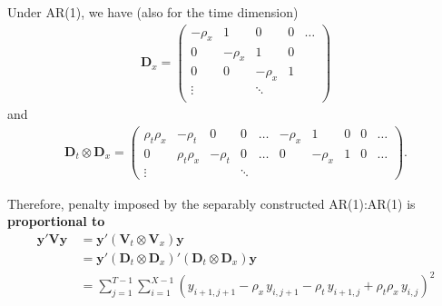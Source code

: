 \documentclass[12pt,a4paper]{article}
\begin{document}
Under AR(1), we have (also for the time dimension)
\begin{align*}
\boldsymbol{D}_x = \begin{pmatrix} -\rho_x & 1 & 0 & 0 & \dots \\
																		  0 & -\rho_x & 1 & 0 & \\
																			0 & 0 & -\rho_x & 1 \\
																		  \vdots & & \ddots  & &  \\
																			\end{pmatrix}
\end{align*}
and
\begin{align*}
\boldsymbol{D}_t \otimes \boldsymbol{D}_x = \begin{pmatrix} \rho_t \rho_x & -\rho_t & 0 & 0 & \dots & -\rho_x & 1 & 0 & 0 &\dots \\
 0 & \rho_t \rho_x & -\rho_t & 0 & \dots & 0 & -\rho_x & 1 & 0 & \dots \\
\vdots & & & \ddots \end{pmatrix}.
\end{align*}

Therefore, penalty imposed by the separably constructed AR(1):AR(1) is \textbf{proportional to}
\begin{align*}
\boldsymbol{y}'\boldsymbol{V}\boldsymbol{y} \, &= \boldsymbol{y}' (\boldsymbol{V}_t \otimes \boldsymbol{V}_x) \boldsymbol{y} \\
&= \boldsymbol{y}' (\boldsymbol{D}_t \otimes \boldsymbol{D}_x)' (\boldsymbol{D}_t \otimes \boldsymbol{D}_x) \boldsymbol{y} \\
&= \sum \limits_{j=1}^{T-1} \sum \limits_{i=1}^{X-1} (y_{i+1, j+1} - \rho_x \, y_{i, j+1} - \rho_t \, y_{i+1,j} + \rho_t \rho_x \, y_{i, j})^2
\end{align*}
\end{document}
